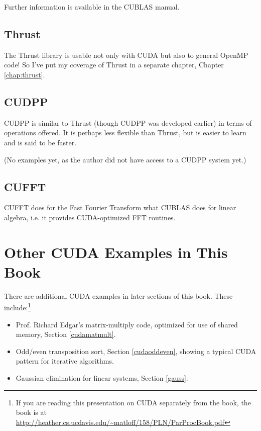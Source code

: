 Further information is available in the CUBLAS manual. 

\subsection{Thrust}

The Thrust library is usable not only with CUDA but also to general
OpenMP code!  So I've put my coverage of Thrust in a separate chapter,
Chapter \ref{chap:thrust}.

\subsection{CUDPP}

CUDPP is similar to Thrust (though CUDPP was developed earlier) in terms
of operations offered.  It is perhaps less flexible than Thrust, but is
easier to learn and is said to be faster.

(No examples yet, as the author did not have access to a CUDPP system
yet.)

\subsection{CUFFT}

CUFFT does for the Fast Fourier Transform what CUBLAS does for linear
algebra, i.e. it provides CUDA-optimized FFT routines.

\section{Other CUDA Examples in This Book}

There are additional CUDA examples in later sections of this book.
These include:\footnote{If you are reading this presentation on CUDA
separately from the book, the book is at
\url{http://heather.cs.ucdavis.edu/~matloff/158/PLN/ParProcBook.pdf}
}

\begin{itemize}

\item Prof. Richard Edgar's matrix-multiply code, optimized for use of
shared memory, Section \ref{cudamatmult}.

\item Odd/even transposition sort, Section \ref{cudaoddeven}, showing a
typical CUDA pattern for iterative algorithms.

\item Gaussian elimination for linear systems, Section \ref{gauss}.

\end{itemize}

